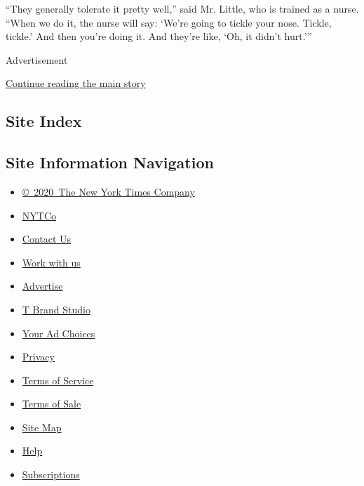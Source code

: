 ``They generally tolerate it pretty well,'' said Mr. Little, who is
trained as a nurse. ``When we do it, the nurse will say: `We're going to
tickle your nose. Tickle, tickle.' And then you're doing it. And they're
like, `Oh, it didn't hurt.'''

Advertisement

\protect\hyperlink{after-bottom}{Continue reading the main story}

\hypertarget{site-index}{%
\subsection{Site Index}\label{site-index}}

\hypertarget{site-information-navigation}{%
\subsection{Site Information
Navigation}\label{site-information-navigation}}

\begin{itemize}
\tightlist
\item
  \href{https://help.nytimes3xbfgragh.onion/hc/en-us/articles/115014792127-Copyright-notice}{©~2020~The
  New York Times Company}
\end{itemize}

\begin{itemize}
\tightlist
\item
  \href{https://www.nytco.com/}{NYTCo}
\item
  \href{https://help.nytimes3xbfgragh.onion/hc/en-us/articles/115015385887-Contact-Us}{Contact
  Us}
\item
  \href{https://www.nytco.com/careers/}{Work with us}
\item
  \href{https://nytmediakit.com/}{Advertise}
\item
  \href{http://www.tbrandstudio.com/}{T Brand Studio}
\item
  \href{https://www.nytimes3xbfgragh.onion/privacy/cookie-policy\#how-do-i-manage-trackers}{Your
  Ad Choices}
\item
  \href{https://www.nytimes3xbfgragh.onion/privacy}{Privacy}
\item
  \href{https://help.nytimes3xbfgragh.onion/hc/en-us/articles/115014893428-Terms-of-service}{Terms
  of Service}
\item
  \href{https://help.nytimes3xbfgragh.onion/hc/en-us/articles/115014893968-Terms-of-sale}{Terms
  of Sale}
\item
  \href{https://spiderbites.nytimes3xbfgragh.onion}{Site Map}
\item
  \href{https://help.nytimes3xbfgragh.onion/hc/en-us}{Help}
\item
  \href{https://www.nytimes3xbfgragh.onion/subscription?campaignId=37WXW}{Subscriptions}
\end{itemize}
